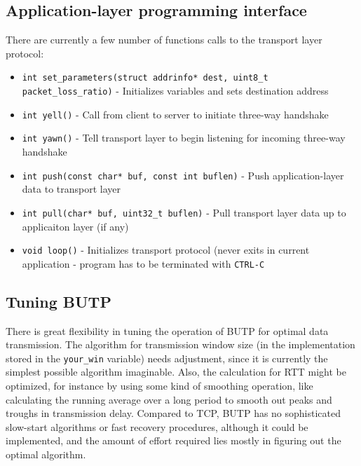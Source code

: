 \documentclass{article}
\begin{document}
\subsection{Application-layer programming interface}
There are currently a few number of functions calls to the transport layer protocol:
\begin{itemize}
  \item \texttt{int set\_parameters(struct addrinfo* dest, uint8\_t packet\_loss\_ratio)} - Initializes variables and sets destination address
  \item \texttt{int yell()} - Call from client to server to initiate three-way handshake
  \item \texttt{int yawn()} - Tell transport layer to begin listening for incoming three-way handshake
  \item \texttt{int push(const char* buf, const int buflen)} - Push application-layer data to transport layer
  \item \texttt{int pull(char* buf, uint32\_t buflen)} - Pull transport layer data up to applicaiton layer (if any)
  \item \texttt{void loop()} - Initializes transport protocol (never exits in current application - program has to be terminated with \texttt{CTRL-C}
\end{itemize}

\subsection{Tuning BUTP}
There is great flexibility in tuning the operation of BUTP for optimal data transmission. The algorithm for transmission window size (in the implementation stored in the \texttt{your\_win} variable) needs adjustment, since it is currently the simplest possible algorithm imaginable. Also, the calculation for RTT might be optimized, for instance by using some kind of smoothing operation, like calculating the running average over a long period to smooth out peaks and troughs in transmission delay.
\newline
\indent Compared to TCP, BUTP has no sophisticated slow-start algorithms or fast recovery procedures, although it could be implemented, and the amount of effort required lies mostly in figuring out the optimal algorithm.
\end{document}
